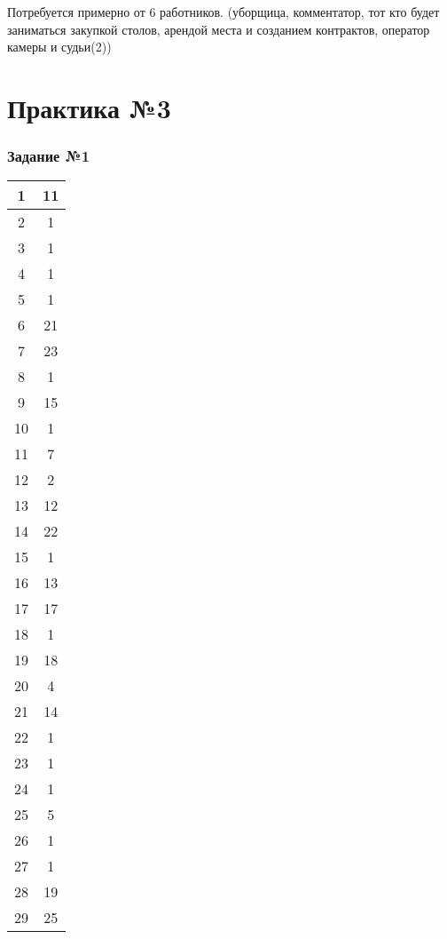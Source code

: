 \documentclass[a4paper, 12pt]{article}
\begin{document}
	Потребуется примерно от 6 работников. (уборщица, комментатор, тот кто будет заниматься закупкой столов, арендой места и созданием контрактов, оператор камеры и судьи(2))
	
	\part*{Практика №3}
	\section{Задание №1}
	\begin{center}
		\begin{tabular}{ | c | c | }
			\hline
			1 & 11 \\
			\hline
			2 & 1 \\
			\hline
			3 & 1 \\
			\hline
			4 & 1 \\
			\hline
			5 & 1 \\
			\hline
			6 & 21 \\
			\hline
			7 & 23 \\
			\hline
			8 & 1 \\
			\hline
			9 & 15 \\
			\hline
			10 & 1 \\
			\hline
			11 & 7 \\
			\hline
			12 & 2 \\
			\hline
			13 & 12 \\
			\hline
			14 & 22 \\
			\hline
			15 & 1 \\
			\hline
			16 & 13 \\
			\hline
			17 & 17 \\
			\hline
			18 & 1 \\
			\hline
			19 & 18 \\
			\hline
			20 & 4 \\
			\hline
			21 & 14 \\
			\hline
			22 & 1 \\
			\hline
			23 & 1 \\
			\hline
			24 & 1 \\
			\hline
			25 & 5 \\
			\hline
			26 & 1 \\
			\hline
			27 & 1 \\
			\hline
			28 & 19 \\
			\hline
			29 & 25 \\
			\hline
		\end{tabular}
	\end{center}
\end{document}
